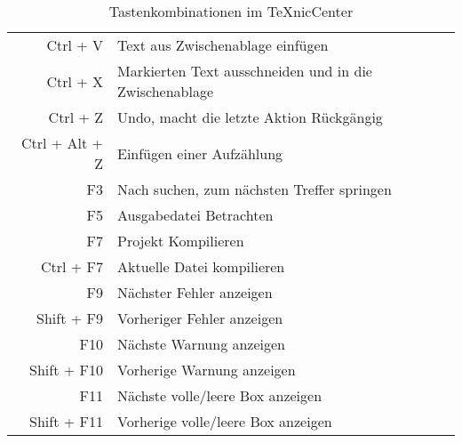 \begin{table}
\begin{center}
\begin{tabular}{rl}
		Ctrl + V & Text aus Zwischenablage einfügen \\
		
		Ctrl + X & Markierten Text ausschneiden und in die Zwischenablage \\
		
		Ctrl + Z & Undo, macht die letzte Aktion Rückgängig \\
		Ctrl + Alt + Z & Einfügen einer Aufzählung \\	
		
		F3 & Nach suchen, zum nächsten Treffer springen \\
		
		F5 & Ausgabedatei Betrachten \\
		F7 & Projekt Kompilieren \\
		Ctrl + F7 & Aktuelle Datei kompilieren \\
		
		F9 & Nächster Fehler anzeigen \\
		Shift + F9 & Vorheriger Fehler anzeigen \\
			
		F10 & Nächste Warnung anzeigen \\
		Shift + F10 & Vorherige Warnung anzeigen \\

		F11 & Nächste volle/leere Box anzeigen \\
		Shift + F11 & Vorherige volle/leere Box anzeigen \\
	\end{tabular}
	\end{center}
	\caption{Tastenkombinationen im TeXnicCenter}
\end{table}
